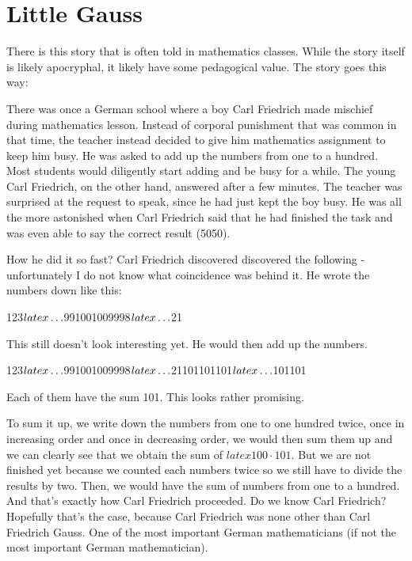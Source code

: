 \chapter{Little Gauss}
There is this story that is often told in mathematics classes. While the story itself is likely apocryphal, it likely have some pedagogical value. The story goes this way:

\vspace{5mm} %

\noindent There was once a German school where a boy Carl Friedrich made mischief during mathematics lesson. Instead of corporal punishment that was common in that time, the teacher instead decided to give him mathematics assignment to keep him busy. He was asked to add up the numbers from one to a hundred. Most students would diligently start adding and be busy for a while. The young Carl Friedrich, on the other hand, answered after a few minutes. The teacher was surprised at the request to speak, since he had just kept the boy busy. He was all the more astonished when Carl Friedrich said that he had finished the task and was even able to say the correct result (5050).

\vspace{5mm} %


\vspace{5mm} %

\noindent How he did it so fast? Carl Friedrich discovered discovered the following - unfortunately I do not know what coincidence was behind it. He wrote the numbers down like this:

123$latex \mathellipsis$991001009998$latex \mathellipsis$21

\noindent This still doesn't look interesting yet. He would then add up the numbers.

123$latex \mathellipsis$991001009998$latex \mathellipsis$21101101101$latex \mathellipsis$101101

\noindent Each of them have the sum 101. This looks rather promising. 

\noindent To sum it up, we write down the numbers from one to one hundred twice, once in increasing order and once in decreasing order, we would then sum them up and we can clearly see that we obtain the sum of $latex 100 \cdot 101$. But we are not finished yet because we counted each numbers twice so we still have to divide the results by two. Then, we would have the sum of numbers from one to a hundred. And that's exactly how Carl Friedrich proceeded. Do we know Carl Friedrich? Hopefully that's the case, because Carl Friedrich was none other than Carl Friedrich Gauss. One of the most important German mathematicians (if not the most important German mathematician).

